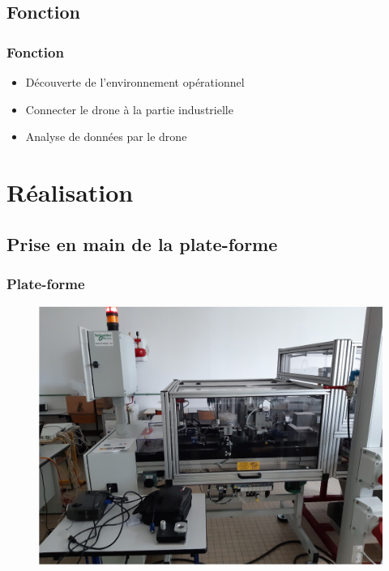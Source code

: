 \documentclass[12pt]{beamer}
\begin{document}
	\subsection{Fonction}
	\begin{frame}[allowframebreaks]
	\frametitle{Fonction}
		\begin{exampleblock}{}
				\begin{itemize}
					[square]
					\item Découverte de l'environnement opérationnel
					\item Connecter le drone à la partie industrielle
					\item Analyse de données par le drone
				\end{itemize}
		\end{exampleblock}
	\end{frame}
	
	
	
	\section{Réalisation}
	\subsection{Prise en main de la plate-forme}
	\begin{frame}
	\frametitle{Plate-forme}
		\begin{figure}[H]
			\centering
			\includegraphics[scale=0.28]{plateforme.jpg}
			\label{fig:plateforme}
		\end{figure}
	\end{frame}
	
\end{document}
